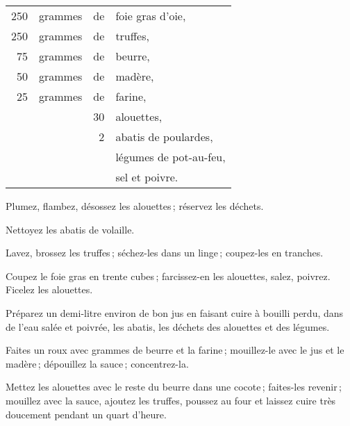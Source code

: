 \footnotesize
\begin{longtable}{rrrp{16em}}
    250 & grammes & de & foie gras d'oie,                                                                 \\
    250 & grammes & de & truffes,                                                                         \\
     75 & grammes & de & beurre,                                                                          \\
     50 & grammes & de & madère,                                                                          \\
     25 & grammes & de & farine,                                                                          \\
        &         & 30 & alouettes,                                                                       \\
        &         &  2 & abatis de poulardes,                                                             \\
        &         &    & légumes de pot-au-feu,                                                           \\
        &         &    & sel et poivre.                                                                   \\
\end{longtable}
\normalsize

Plumez, flambez, désossez les alouettes ; réservez les déchets.

Nettoyez les abatis de volaille.

Lavez, brossez les truffes ; séchez-les dans un linge ; coupez-les en tranches.

Coupez le foie gras en trente cubes ; farcissez-en les alouettes, salez,
poivrez. Ficelez les alouettes.

Préparez un demi-litre environ de bon jus en faisant cuire à bouilli perdu,
dans de l'eau salée et poivrée, les abatis, les déchets des alouettes et des
légumes.

Faites un roux avec {\mmm} grammes de beurre et la farine ; mouillez-le
avec le jus et le madère ; dépouillez la sauce ; concentrez-la.

Mettez les alouettes avec le reste du beurre dans une cocote ; faites-les
revenir ; mouillez avec la sauce, ajoutez les truffes, poussez au four et
laissez cuire très doucement pendant un quart d'heure.

